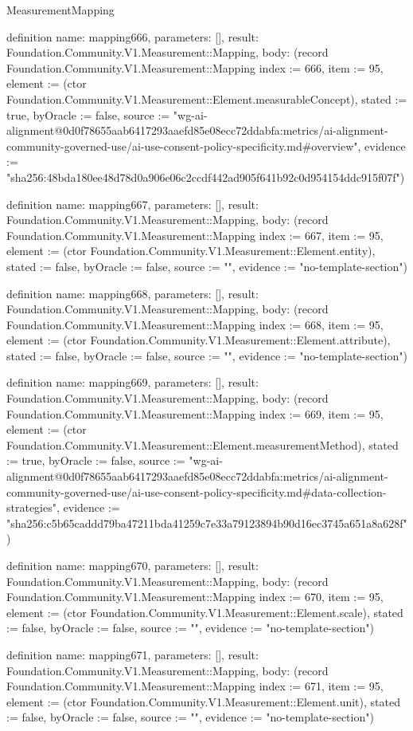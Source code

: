 \begin{lexlean}{MeasurementMapping}
\begin{semanticmodule}
definition{
  name: mapping666,
  parameters: [],
  result: Foundation.Community.V1.Measurement::Mapping,
  body: (record Foundation.Community.V1.Measurement::Mapping {index := 666, item := 95, element := (ctor Foundation.Community.V1.Measurement::Element.measurableConcept), stated := true, byOracle := false, source := "wg-ai-alignment@0d0f78655aab6417293aaefd85e08ecc72ddabfa:metrics/ai-alignment-community-governed-use/ai-use-consent-policy-specificity.md#overview", evidence := "sha256:48bda180ee48d78d0a906e06c2ccdf442ad905f641b92c0d954154ddc915f07f"})
}

definition{
  name: mapping667,
  parameters: [],
  result: Foundation.Community.V1.Measurement::Mapping,
  body: (record Foundation.Community.V1.Measurement::Mapping {index := 667, item := 95, element := (ctor Foundation.Community.V1.Measurement::Element.entity), stated := false, byOracle := false, source := "", evidence := "no-template-section"})
}

definition{
  name: mapping668,
  parameters: [],
  result: Foundation.Community.V1.Measurement::Mapping,
  body: (record Foundation.Community.V1.Measurement::Mapping {index := 668, item := 95, element := (ctor Foundation.Community.V1.Measurement::Element.attribute), stated := false, byOracle := false, source := "", evidence := "no-template-section"})
}

definition{
  name: mapping669,
  parameters: [],
  result: Foundation.Community.V1.Measurement::Mapping,
  body: (record Foundation.Community.V1.Measurement::Mapping {index := 669, item := 95, element := (ctor Foundation.Community.V1.Measurement::Element.measurementMethod), stated := true, byOracle := false, source := "wg-ai-alignment@0d0f78655aab6417293aaefd85e08ecc72ddabfa:metrics/ai-alignment-community-governed-use/ai-use-consent-policy-specificity.md#data-collection-strategies", evidence := "sha256:c5b65caddd79ba47211bda41259c7e33a79123894b90d16ec3745a651a8a628f"})
}

definition{
  name: mapping670,
  parameters: [],
  result: Foundation.Community.V1.Measurement::Mapping,
  body: (record Foundation.Community.V1.Measurement::Mapping {index := 670, item := 95, element := (ctor Foundation.Community.V1.Measurement::Element.scale), stated := false, byOracle := false, source := "", evidence := "no-template-section"})
}

definition{
  name: mapping671,
  parameters: [],
  result: Foundation.Community.V1.Measurement::Mapping,
  body: (record Foundation.Community.V1.Measurement::Mapping {index := 671, item := 95, element := (ctor Foundation.Community.V1.Measurement::Element.unit), stated := false, byOracle := false, source := "", evidence := "no-template-section"})
}


\end{semanticmodule}
\end{lexlean}
